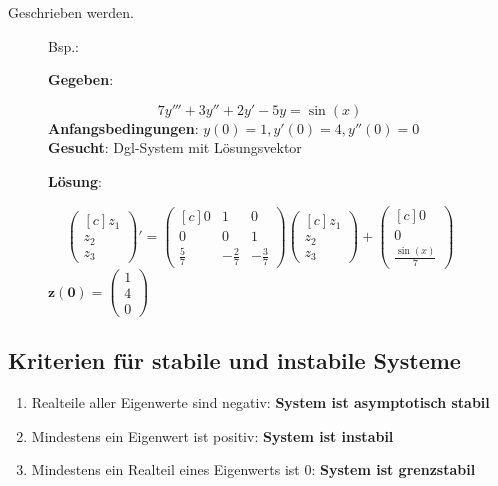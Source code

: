 \documentclass[12pt, a4paper]{scrreprt}
\begin{document}
Geschrieben werden.\\[2em]
\myhspace{}
\begin{figure}[H]
Bsp.:

\textbf{Gegeben}:

\[
  7y''' + 3y'' + 2y' - 5y = \sin(x)
\]
\textbf{Anfangsbedingungen}: \(y(0) = 1, y'(0) = 4, y''(0) = 0\)\\[2em]

\textbf{Gesucht}: Dgl-System mit Lösungsvektor

\textbf{Lösung}:

\[
  \begin{pmatrix*}[c]
    z_1\\
    z_2\\
    z_3
  \end{pmatrix*} ' =
  \begin{pmatrix*}[c]
    0 & 1 & 0\\
    0 & 0 & 1\\
    \frac{5}{7} & - \frac{2}{7} & - \frac{3}{7}
  \end{pmatrix*}
  \begin{pmatrix*}[c]
    z_1\\
    z_2\\
    z_3
  \end{pmatrix*} +
  \begin{pmatrix*}[c]
    0\\
    0\\
    \frac{\sin(x)}{7}
  \end{pmatrix*}
\]
\(\mathbf{z(0)} = \left( \begin{smallmatrix} 1 \\ 4 \\ 0 \end{smallmatrix} \right)\)
\end{figure}

\subsection{Kriterien für stabile und instabile Systeme}
\begin{enumerate}
\item Realteile aller Eigenwerte sind negativ: \textbf{System ist asymptotisch stabil}
\item Mindestens ein Eigenwert ist positiv: \textbf{System ist instabil}
\item Mindestens ein Realteil eines Eigenwerts ist 0: \textbf{System ist grenzstabil}
\end{enumerate}
\end{document}
